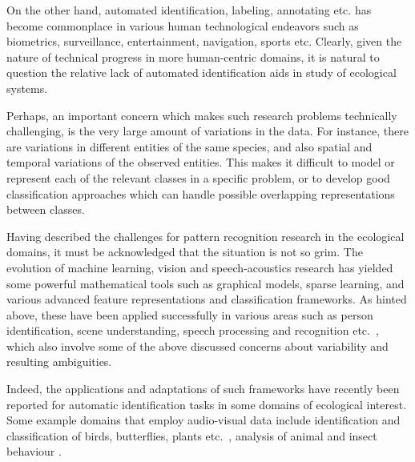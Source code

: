 \documentclass{article}
\begin{document}
On the other hand, automated identification, labeling, annotating etc. has
become commonplace in various human technological endeavors such as biometrics,
surveillance, entertainment, navigation, sports etc. Clearly, given the nature
of technical progress in more human-centric domains, it is natural to question
the relative lack of automated identification aids in study of ecological
systems. 

Perhaps, an important concern 
which makes such research problems technically challenging, is the very large
amount of variations in the data. For instance, there are variations in
different entities of the same species, and also spatial and temporal variations
of the observed entities. This makes it difficult to model or represent each of
the relevant classes in a specific problem, or to develop good classification
approaches which can handle possible overlapping representations between
classes.

Having described the challenges for pattern recognition research in the
ecological domains, it must be acknowledged that the situation is not so grim.
The evolution of machine learning, vision and speech-acoustics research has
yielded some powerful mathematical tools such as graphical models, sparse
learning, and various advanced feature representations and classification
frameworks. 
As hinted above, these have been applied successfully in various areas such as
person identification, scene understanding, speech processing and recognition
etc.~, which also involve some of the above discussed concerns about variability
and resulting ambiguities. 

Indeed, the applications and adaptations of such frameworks have recently been
reported for automatic identification tasks in some domains of ecological
interest. Some example domains that employ audio-visual data include
identification and classification of birds, butterflies, plants etc.~, analysis
of animal and insect behaviour
\cite{leaf,butterfly,hierarchy,poof,brandes_automatedSoundRecording2008}. 
\end{document}
